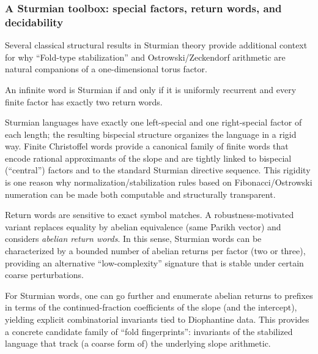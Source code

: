 \subsubsection{A Sturmian toolbox: special factors, return words, and decidability}\label{sec:readout:sturmian-toolbox}

Several classical structural results in Sturmian theory provide additional context for why ``Fold-type stabilization'' and Ostrowski/Zeckendorf arithmetic are natural companions of a one-dimensional torus factor.

\begin{proposition}\label{prop:sturmian-return-words}
An infinite word is Sturmian if and only if it is uniformly recurrent and every finite factor has exactly two return words.
\cite{Vuillon2001ReturnWordsSturmian}
\end{proposition}

\begin{remark}\label{rem:christoffel-bispecial}
Sturmian languages have exactly one left-special and one right-special factor of each length; the resulting bispecial structure organizes the language in a rigid way. Finite Christoffel words provide a canonical family of finite words that encode rational approximants of the slope and are tightly linked to bispecial (``central'') factors and to the standard Sturmian directive sequence.\cite{Lothaire2002,BerstelLauveReutenauerSaliola2008Christoffel} This rigidity is one reason why normalization/stabilization rules based on Fibonacci/Ostrowski numeration can be made both computable and structurally transparent.
\end{remark}

\begin{remark}\label{rem:abelian-returns}
Return words are sensitive to exact symbol matches. A robustness-motivated variant replaces equality by abelian equivalence (same Parikh vector) and considers \emph{abelian return words}. In this sense, Sturmian words can be characterized by a bounded number of abelian returns per factor (two or three), providing an alternative ``low-complexity'' signature that is stable under certain coarse perturbations.\cite{PuzyninaZamboni2012AbelianReturns}
\end{remark}

\begin{remark}\label{rem:abelian-returns-cf}
For Sturmian words, one can go further and enumerate abelian returns to prefixes in terms of the continued-fraction coefficients of the slope (and the intercept), yielding explicit combinatorial invariants tied to Diophantine data.\cite{MasakovaPelantova2013AbelianReturnsPrefixes} This provides a concrete candidate family of ``fold fingerprints'': invariants of the stabilized language that track (a coarse form of) the underlying slope arithmetic.
\end{remark}

